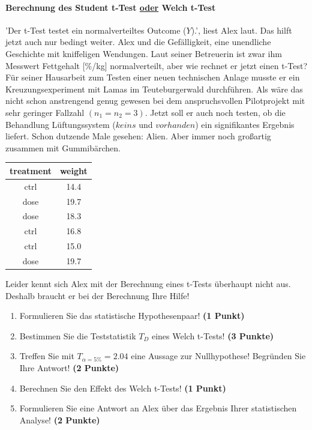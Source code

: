 \documentclass[a4paper, 9pt]{scrartcl}\usepackage[]{graphicx}\usepackage[]{xcolor}
\begin{document}
\ifcollection
\paragraph{Berechnung des Student t-Test \underline{oder} Welch t-Test}
\fi

'Der t-Test testet ein normalverteiltes Outcome ($Y$).', liest Alex laut. Das hilft jetzt auch nur bedingt weiter. Alex und die Gefälligkeit, eine unendliche Geschichte mit kniffeligen Wendungen. Laut seiner Betreuerin ist zwar ihm Messwert Fettgehalt [\%/kg] normalverteilt, aber wie rechnet er jetzt einen t-Test? Für seiner Hausarbeit zum Testen einer neuen technischen Anlage musste er ein Kreuzungsexperiment mit Lamas im Teuteburgerwald durchführen. Als wäre das nicht schon anstrengend genug gewesen bei dem anspruchsvollen Pilotprojekt mit sehr geringer Fallzahl $(n_1 = n_2 = 3)$. Jetzt soll er auch noch testen, ob die Behandlung Lüftungssystem ($keins$ und $vorhanden$) ein signifikantes Ergebnis liefert. Schon dutzende Male gesehen: Alien. Aber immer noch großartig zusammen mit Gummibärchen.

\begin{table}[!h]
\centering
\begin{tabular}{cc}
\toprule
treatment & weight\\
\midrule
ctrl & 14.4\\
dose & 19.7\\
dose & 18.3\\
ctrl & 16.8\\
ctrl & 15.0\\
\addlinespace
dose & 19.7\\
\bottomrule
\end{tabular}
\end{table}



Leider kennt sich Alex mit der Berechnung eines t-Tests überhaupt nicht aus. Deshalb braucht er bei der Berechnung Ihre Hilfe!

\begin{enumerate}
  \item Formulieren Sie das statistische Hypothesenpaar! \textbf{(1 Punkt)}
  \item Bestimmen Sie die Teststatistik $T_{D}$ eines Welch t-Tests! \textbf{(3 Punkte)}
  \item Treffen Sie mit $T_{\alpha = 5\%} = 2.04$ eine Aussage zur Nullhypothese! Begründen Sie Ihre Antwort! \textbf{(2 Punkte)}
  \item Berechnen Sie den Effekt des Welch t-Tests! \textbf{(1 Punkt)}
  \item Formulieren Sie eine Antwort an Alex über das Ergebnis Ihrer statistischen Analyse! \textbf{(2 Punkte)}
\end{enumerate} 
\clearpage
\end{document}
